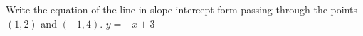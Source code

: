 {Write the equation of the line in slope-intercept form passing through the points $(1,2)$ and $(-1,4)$.}
{$y=-x+3$}
